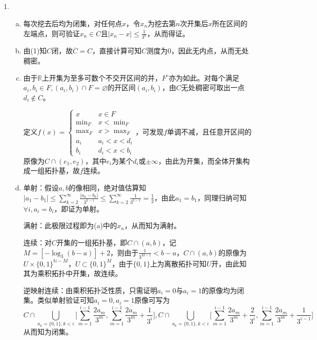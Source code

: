 \documentclass[a4paper,UTF8,fontset=windows]{ctexart}
\begin{document}
\subsection{}
\begin{enumerate}[(1)]
    \item
    \begin{enumerate}[(a)]
    \item
    每次挖去后均为闭集，对任何点$x$，令$x_n$为挖去第$n$次开集后$x$所在区间的左端点，则可验证$x_n\in C$且$|x_n-x|\le\frac{1}{3^n}$，从而得证。
    
    \item
    由(1)知$C$闭，故$\overline{C}=C$，直接计算可知$C$测度为0，因此无内点，从而无处稠密。
    
    \item
    由于$\mathbb{R}$上开集为至多可数个不交开区间的并，$F^c$亦为如此。对每个满足$a_i,b_i\in F,(a_i,b_i)\cap F=\varnothing$的开区间$(a_i,b_i)$，由$C$无处稠密可取出一点$d_i\notin C$。
    
    定义$f(x)=\begin{cases}x&x\in F\\\min_F&x<\min_F\\\max_F&x>\max_F\\a_i&a_i<x<d_i\\b_i&d_i<x<b_i\end{cases}$，可发现$f$单调不减，且任意开区间的原像为$C\cap(e_1,e_2)$，其中$e_i$为某个$d_i$或$\pm\infty$，由此为开集，而全体开集构成一组拓扑基，故$f$连续。
    
    \item
    单射：假设$a,b$的像相同，绝对值估算知$|a_1-b_1|\le\sum_{k=2}^\infty\frac{|a_k-b_k|}{3^{k-1}}\le\sum_{k=2}^\infty\frac{1}{3^{k-1}}=\frac{1}{2}$，由此$a_1=b_1$，同理归纳可知$\forall i,a_i=b_i$，即证为单射。
    
    满射：此极限过程即为(a)中的$x_n$，从而知为满射。
    
    连续：对$C$开集的一组拓扑基，即$C\cap(a,b)$，记$M=[-\log_3(b-a)]+2$，则由于$\frac{1}{3^{M-1}}<b-a$，$C\cap(a,b)$的原像为$U\times\{0,1\}^{\mathbb{N}-M}$，$U\subset\{0,1\}^M$，由于$\{0,1\}$上为离散拓扑可知$U$开，由此知其为乘积拓扑中开集，故连续。
    
    逆映射连续：由乘积拓扑泛性质，只需证明$a_i=0$与$a_i=1$的原像均为闭集。类似单射验证可知$a_i=0,a_i=1$原像可写为
    \[C\cap\bigcup_{a_k=\{0,1\},k<i}\bigg[\sum_{m=1}^{i-1}\frac{2a_m}{3^m},\sum_{m=1}^{i-1}\frac{2a_m}{3^m}+\frac{1}{3^i}\bigg],C\cap\bigcup_{a_k=\{0,1\},k<i}\bigg[\sum_{m=1}^{i-1}\frac{2a_m}{3^m}+\frac{2}{3^i},\sum_{m=1}^{i-1}\frac{2a_m}{3^m}+\frac{1}{3^{i-1}}\bigg]\]
    从而知为闭集。
    

\end{enumerate}
\end{enumerate}
\end{document}
